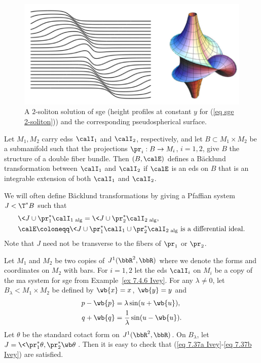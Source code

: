 \begin{figure}[tp]
    \centering
    \includegraphics[scale=0.2]{figures/SG2soliton.png}
    \caption{A $2$-soliton solution of \gls{sge} (height profiles at constant $y$ for (\ref{eq sge 2-soliton})) and the corresponding pseudospherical surface.}
    \label{fig:2-soliton}
\end{figure}


\begin{defn}
    Let $M_1,M_2$ carry \glspl{eds} $\calI_1$ and $\calI_2$, respectively, and let $B\subset M_1\times M_2$ be a submanifold such that the projections $\pr_i:B\to M_i$, $i=1,2$, give $B$ the structure of a double fiber bundle. Then $(B,\calE)$ defines a B\"acklund transformation between $\calI_1$ and $\calI_2$ if $\calE$ is an \gls{eds} on $B$ that is an integrable extension of both $\calI_1$ and $\calI_2$.
\end{defn}

We will often define B\"acklund transformations by giving a Pfaffian system $J<\T^\ast B$ such that 
\begin{align}
    &\<J\cup \pr_1^\ast \calI_1\>_{\mathrm{alg}}=\<J\cup \pr_2^\ast\calI_2\>_{\mathrm{alg}},\label{eq 7.37a Ivey}\\
    &\calE\coloneqq \<J\cup \pr_1^\ast \calI_1\cup \pr_2^\ast \calI_2\>_{\mathrm{alg}}\text{ is a differential ideal}.\label{eq 7.37b Ivey}
\end{align}
Note that $J$ need not be transverse to the fibers of $\pr_1$ or $\pr_2$.

\begin{example}
    Let $M_1$ and $M_2$ be two copies of $J^1(\bbR^2,\bbR)$ where we denote the forms and coordinates on $M_2$ with bars. For $i=1,2$ let the \gls{eds} $\calI_i$ on $M_i$ be a copy of the \gls{ma} system for \gls{sge} from Example~\ref{ex 7.4.6 Ivey}. For any $\lambda\neq 0$, let $B_\lambda<M_1\times M_2$ be defined by $\wb{x}=x$, $\wb{y}=y$ and 
    \begin{align}
        p-\wb{p}&=\lambda\sin(u+\wb{u}),\\
        q+\wb{q}&=\frac{1}{\lambda}\sin(u-\wb{u}).
    \end{align}
    Let $\theta$ be the standard cotact form on $J^1(\bbR^2,\bbR)$. On $B_\lambda$, let $J=\<\pr_1^\ast\theta,\pr_2^\ast\wb\theta\>$. Then it is easy to check that (\ref{eq 7.37a Ivey}-\ref{eq 7.37b Ivey}) are satisfied.
\end{example}

